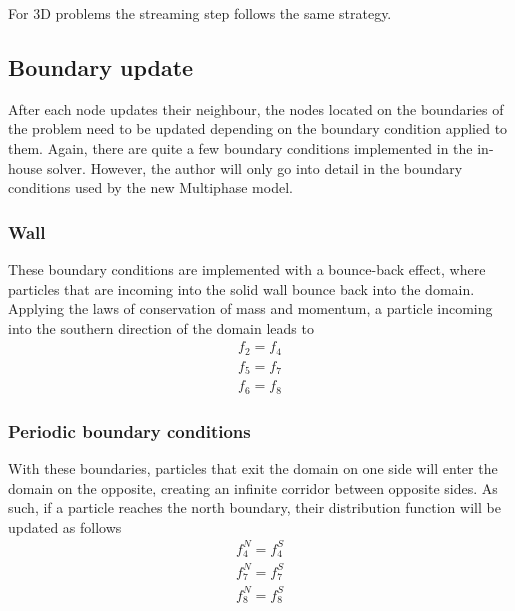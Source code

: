 \documentclass[12pt]{book}
\begin{document}
For 3D problems the streaming step follows the same strategy.
\subsection{Boundary update}\label{sec:boundary}
After each node updates their neighbour, the nodes located on the boundaries of the problem need to be updated depending on the boundary condition applied to them. Again, there are quite a few boundary conditions implemented in the in-house solver. However, the author will only go into detail in the boundary conditions used by the new Multiphase model.\par
\subsubsection{Wall}
	These boundary conditions are implemented with a bounce-back effect, where particles that are incoming into the solid wall bounce back into the domain. Applying the laws of conservation of mass and momentum, a particle incoming into the southern direction of the domain leads to  
	\begin{equation*}
		\begin{aligned}
			f_2 = f_4 \\
			f_5 = f_7 \\
			f_6 = f_8
		\end{aligned}
	\end{equation*}
	\subsubsection{Periodic boundary conditions} 
	With these boundaries, particles that exit the domain on one side will enter the domain on the opposite, creating an infinite corridor between opposite sides. As such, if a particle reaches the north boundary, their distribution function will be updated as follows
	\begin{equation*}
		\begin{aligned}
			f_4^N = f_4^S \\
			f_7^N = f_7^S \\
			f_8^N = f_8^S
		\end{aligned}
	\end{equation*}
\end{document}
